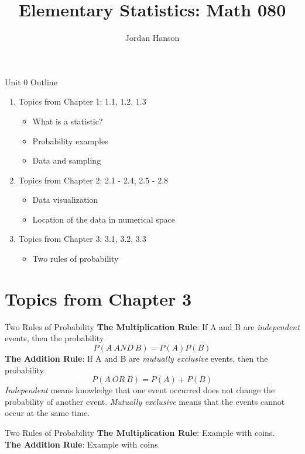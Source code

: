 \documentclass{beamer}
\title{Elementary Statistics: Math 080}
\author{Jordan Hanson}
\institute{Whittier College Department of Physics and Astronomy}
\begin{document}
\maketitle

\begin{frame}{Unit 0 Outline}
\begin{enumerate}
\item Topics from Chapter 1: 1.1, 1.2, 1.3
\begin{itemize}
\item What is a statistic?
\item Probability examples
\item Data and sampling
\end{itemize}
\item Topics from Chapter 2: 2.1 - 2.4, 2.5 - 2.8
\begin{itemize}
\item Data visualization
\item Location of the data in numerical space
\end{itemize}
\item Topics from Chapter 3: 3.1, 3.2, 3.3
\begin{itemize}
\item Two rules of probability
\end{itemize}
\end{enumerate}
\end{frame}

\section{Topics from Chapter 3}

\begin{frame}[fragile]{Two Rules of Probability}
\alert{\textbf{The Multiplication Rule}}: If A and B are \textit{independent} events, then the probability
\begin{equation}
P(A~AND~B) = P(A) P(B)
\end{equation}
\alert{\textbf{The Addition Rule}}: If A and B are \textit{mutually exclusive} events, then the probability
\begin{equation}
P(A~OR~B) = P(A) + P(B)
\end{equation}
\textit{Independent} means knowledge that one event occurred does not change the probability of another event.  \textit{Mutually exclusive} means that the events cannot occur at the same time.
\end{frame}

\begin{frame}[fragile]{Two Rules of Probability}
\alert{\textbf{The Multiplication Rule}}: Example with coins. \\ \vspace{3cm}
\alert{\textbf{The Addition Rule}}: Example with coins.
\end{frame}
\end{document}
